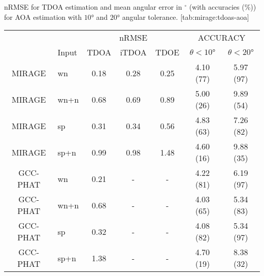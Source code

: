 \begin{table}[ht!]
    \begin{sidecaption}{%
        \ac{nRMSE} for TDOA estimation and mean angular error in ${}^\circ$ (with accuracies ($\%$))
        for AOA estimation with $\ang{10}$ and $\ang{20}$ angular tolerance.
    }[tab:mirage:tdoas-aoa]
    \centering
    \small
    \begin{tabular*}{\linewidth}{@{\extracolsep{\fill}}cl|ccc|cc@{}}
    \toprule
                &         &          & nRMSE        &                   &\multicolumn{2}{c}{ACCURACY}  \\
                & Input   &    \scriptsize{TDOA}  	&   \scriptsize{iTDOA} 		 &     \scriptsize{TDOE} 		 & $\theta<\ang{10}$ &  $\theta<\ang{20}$ \\
    \midrule
    MIRAGE      &   wn    & 0.18    & 0.28  & 0.25 	& 4.10 (77)	& 5.97 (97) \\
    MIRAGE      &   wn+n  & 0.68    & 0.69  & 0.89 	& 5.00 (26)	& 9.89 (54) \\
    MIRAGE      &   sp    & 0.31    & 0.34  & 0.56  & 4.83 (63)	& 7.26 (82) \\
    MIRAGE      &   sp+n  & 0.99    & 0.98  & 1.48 	& 4.60 (16)	& 9.88 (35) \\
    GCC-PHAT    &   wn    & 0.21    & -     & -		& 4.22 (81) & 6.19 (97) \\
    GCC-PHAT    &   wn+n  & 0.68    & -     & -		& 4.03 (65) & 5.34 (83) \\
    GCC-PHAT    &   sp 	  & 0.32    & -     & -		& 4.08 (82) & 5.34 (97) \\
    GCC-PHAT    &   sp+n  & 1.38    & -     & -		& 4.70 (19) & 8.38 (32) \\
    \bottomrule
    \end{tabular*}
    \end{sidecaption}
\end{table}
